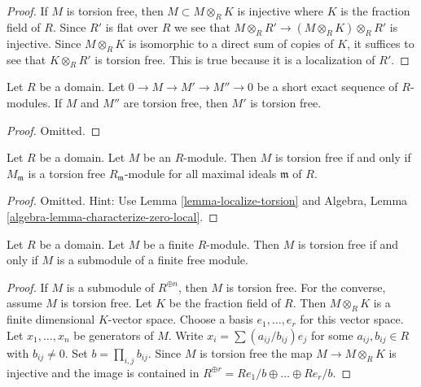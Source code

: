 \begin{proof}
If $M$ is torsion free, then $M \subset M \otimes_R K$ is injective
where $K$ is the fraction field of $R$. Since $R'$ is flat over $R$
we see that $M \otimes_R R' \to (M \otimes_R K) \otimes_R R'$ is injective.
Since $M \otimes_R K$ is isomorphic to a direct sum of copies of $K$,
it suffices to see that $K \otimes_R R'$ is torsion free. This is true
because it is a localization of $R'$.
\end{proof}

\begin{lemma}
\label{lemma-extension-torsion-free}
Let $R$ be a domain. Let $0 \to M \to M' \to M'' \to 0$
be a short exact sequence of $R$-modules. If $M$ and $M''$
are torsion free, then $M'$ is torsion free.
\end{lemma}

\begin{proof}
Omitted.
\end{proof}

\begin{lemma}
\label{lemma-check-torsion}
Let $R$ be a domain. Let $M$ be an $R$-module.
Then $M$ is torsion free if and only if $M_\mathfrak m$ is a
torsion free $R_\mathfrak m$-module for all maximal ideals
$\mathfrak m$ of $R$.
\end{lemma}

\begin{proof}
Omitted. Hint: Use Lemma \ref{lemma-localize-torsion} and
Algebra, Lemma \ref{algebra-lemma-characterize-zero-local}.
\end{proof}

\begin{lemma}
\label{lemma-finite-torsion-free-submodule-free}
Let $R$ be a domain. Let $M$ be a finite $R$-module.
Then $M$ is torsion free if and only if $M$ is a
submodule of a finite free module.
\end{lemma}

\begin{proof}
If $M$ is a submodule of $R^{\oplus n}$, then $M$ is torsion free.
For the converse, assume $M$ is torsion free. Let $K$ be the
fraction field of $R$. Then $M \otimes_R K$ is a finite dimensional
$K$-vector space. Choose a basis $e_1, \ldots, e_r$ for this vector
space. Let $x_1, \ldots, x_n$ be generators of $M$. Write
$x_i = \sum (a_{ij}/b_{ij}) e_j$ for some $a_{ij}, b_{ij} \in R$
with $b_{ij} \not = 0$. Set $b = \prod_{i, j} b_{ij}$.
Since $M$ is torsion free the map
$M \to M \otimes_R K$ is injective and the image is contained
in $R^{\oplus r} = R e_1/b \oplus \ldots \oplus Re_r/b$.
\end{proof}

